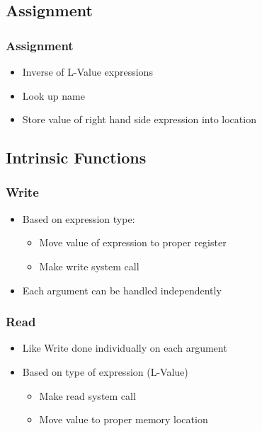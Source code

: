 \documentclass[usepdftitle=false,professionalfonts,compress ]{beamer}
\begin{document}
\subsection{Assignment}

{
\begin{frame}\frametitle{Assignment}

	\begin{itemize}
	\item Inverse of L-Value expressions
			\item Look up name
			\item Store value of right hand side expression into location
				\end{itemize}

\end{frame}}





\subsection{Intrinsic Functions}

{
\begin{frame}\frametitle{Write}

	\begin{itemize}
	\item Based on expression type:

	\begin{itemize}
	\item Move value of expression to proper register
			\item Make write system call
				\end{itemize}

			\item Each argument can be handled independently
				\end{itemize}

\end{frame}}




{
\begin{frame}\frametitle{Read}

	\begin{itemize}
	\item Like Write done individually on each argument
			\item Based on type of expression (L-Value)

	\begin{itemize}
	\item Make read system call
			\item Move value to proper memory location
				\end{itemize}

				\end{itemize}

\end{frame}}
\end{document}
